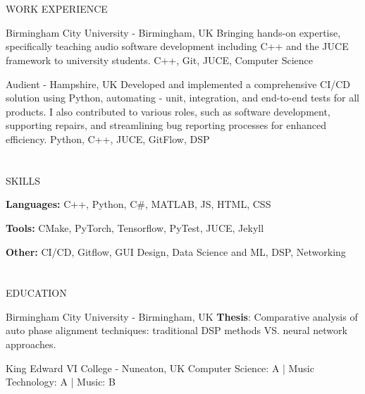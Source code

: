 \documentclass{my_cv}
\begin{document}
\begin{multicols}{2}
\section{\faPencil}{WORK EXPERIENCE}

%
    {Birmingham City University - Birmingham, UK}%
    {Bringing hands-on expertise, specifically teaching audio software development including C++ and the JUCE framework to university students.}%
    {C++, Git, JUCE, Computer Science}
    
%
    {Audient - Hampshire, UK}%
    {Developed and implemented a comprehensive CI/CD solution using Python, automating - unit, integration, and end-to-end tests for all products. I also contributed to various roles, such as software development, supporting repairs, and streamlining bug reporting processes for enhanced efficiency.}
    {Python, C++, JUCE, GitFlow, DSP}
    
\section{\faList}{SKILLS}

\textbf{Languages:} C++, Python, C\#, MATLAB, JS, HTML, CSS

\noindent\textbf{Tools:} CMake, PyTorch, Tensorflow, PyTest, JUCE, Jekyll

\noindent\textbf{Other:} CI/CD, Gitflow, GUI Design, Data Science and ML, DSP, Networking

\section{\faGraduationCap}{EDUCATION}
    
{Birmingham City University - Birmingham, UK} %
{\textbf{{Thesis}}: Comparative analysis of auto phase alignment techniques: traditional DSP methods VS. neural network approaches.}
    
{King Edward VI College - Nuneaton, UK} %
{Computer Science: A
| Music Technology: A
| Music: B}


\end{multicols}
\end{document}
